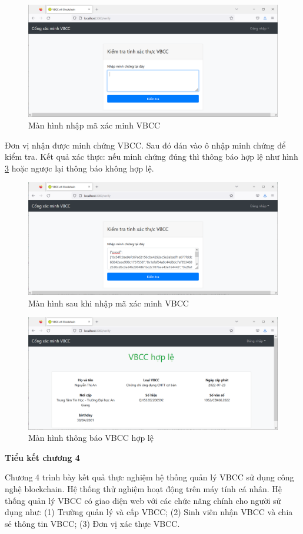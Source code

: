 \begin{figure}[H]
\centering
\includegraphics[width=.9\linewidth]{img/manhinh_donvixacminh_vbegin.PNG}
\caption{Màn hình nhập mã xác minh VBCC}
\label{fig:manhinh_donvixacminh_vbegin}
\end{figure}


Đơn vị nhận được minh chứng VBCC. 
Sau đó dán vào ô nhập minh chứng để kiểm tra.
Kết quả xác thực: nếu minh chứng đúng thì thông báo hợp lệ như hình \ref{fig:xacminh_hople} hoặc ngược lại thông báo không hợp lệ.
\begin{figure}[H]
\centering
\includegraphics[width=.9\linewidth]{img/v_begin.PNG}
\caption{Màn hình sau khi nhập mã xác minh VBCC}
\label{fig:v_begin}
\end{figure}

\begin{figure}[H]
\centering
\includegraphics[width=.9\linewidth]{img/xacminh_hople.PNG}
\caption{Màn hình thông báo VBCC hợp lệ}
\label{fig:xacminh_hople}
\end{figure}

\textbf{Tiểu kết chương 4}

Chương 4 trình bày kết quả thực nghiệm hệ thống quản lý VBCC sử dụng công nghệ blockchain. Hệ thống thử nghiệm hoạt động trên máy tính cá nhân. Hệ thống quản lý VBCC có giao diện web với các chức năng chính cho người sử dụng như: (1) Trường quản lý và cấp VBCC; (2) Sinh viên nhận VBCC và chia sẻ thông tin VBCC; (3) Đơn vị xác thực VBCC. 
